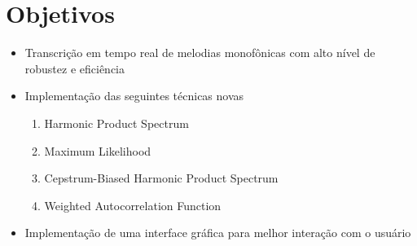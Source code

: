 \section{Objetivos}
\label{sec:objetivos}

\begin{itemize}
\item Transcrição em tempo real de melodias monofônicas com alto nível de robustez e eficiência
\item Implementação das seguintes técnicas novas
\begin{enumerate}
	\item Harmonic Product Spectrum
\item Maximum Likelihood
\item Cepstrum-Biased Harmonic Product Spectrum
\item Weighted Autocorrelation Function
\end{enumerate}
\item Implementação de uma interface gráfica para melhor interação com o usuário
\end{itemize}